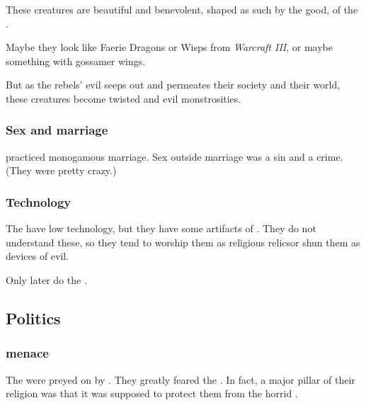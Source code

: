 These creatures are beautiful and benevolent, shaped as such by the good,  of the \resphain{}. 

Maybe they look like Faerie Dragons or Wisps from \emph{Warcraft III}, or maybe something with gossamer wings.

But as the rebels' evil seeps out and permeates their society and their world, these creatures become twisted and evil monstrosities.






\subsubsection{Sex and marriage}
\Merkyrah{} practiced monogamous marriage.
Sex outside marriage was a sin and a crime. 
(They were pretty crazy.) 





\subsubsection{Technology}
The \Merkyrans{} have low technology, but they have some artifacts of . 
They do not understand these, so they tend to worship them as religious relics\dash or shun them as devices of evil. 

Only later do the \resphain{} . 









\subsection{Politics}





\subsubsection{\Umbra{} menace}
The \Merkyrans{} were preyed on by \umbrae. 
They greatly feared the \umbrae. 
In fact, a major pillar of their religion was that it was supposed to protect them from the horrid \umbrae{}. 

